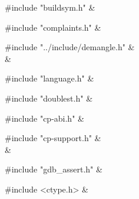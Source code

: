 \medskip
\begin{cxreftabi}
{\stt \#include "buildsym.h"} &\\
\end{cxreftabi}

\medskip
\begin{cxreftabi}
{\stt \#include "complaints.h"} &\\
\end{cxreftabi}

\medskip
\begin{cxreftabi}
{\stt \#include "../include/demangle.h"} &\\
\hspace*{0.2in}{\stt \#include "../include/libiberty.h"} &\\
\end{cxreftabi}

\medskip
\begin{cxreftabi}
{\stt \#include "language.h"} &\\
\end{cxreftabi}

\medskip
\begin{cxreftabi}
{\stt \#include "doublest.h"} &\\
\end{cxreftabi}

\medskip
\begin{cxreftabi}
{\stt \#include "cp-abi.h"} &\\
\end{cxreftabi}

\medskip
\begin{cxreftabi}
{\stt \#include "cp-support.h"} &\\
\hspace*{0.2in}{\stt \#include "symtab.h"} &\\
\end{cxreftabi}

\medskip
\begin{cxreftabi}
{\stt \#include "gdb\_assert.h"} &\\
\end{cxreftabi}

\medskip
\begin{cxreftabi}
{\stt \#include <ctype.h>} &\\
\end{cxreftabi}

